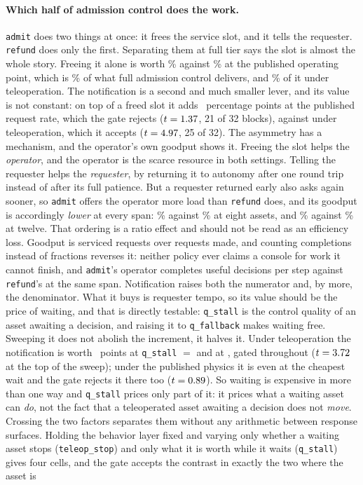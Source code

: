 \documentclass[11pt]{article}
\begin{document}
\paragraph{Which half of admission control does the work.} \texttt{admit} does two things at once: it frees the service slot, and it tells the requester. \texttt{refund} does only the first. Separating them at full tier says the slot is almost the whole story. Freeing it alone is worth \qRefundClear\% against \qBlindClear\% at the published operating point, which is \qRefundShare\% of what full admission control delivers, and \qTeleRefundShare\% of it under teleoperation. The notification is a second and much smaller lever, and its value is not constant: on top of a freed slot it adds \qNotifyPub{}~percentage points at the published request rate, which the gate rejects ($t = 1.37{}$, 21 of 32 blocks), against \qNotifyTele{} under teleoperation, which it accepts ($t = 4.97{}$, 25 of 32). The asymmetry has a mechanism, and the operator's own goodput shows it. Freeing the slot helps the \emph{operator}, and the operator is the scarce resource in both settings. Telling the requester helps the \emph{requester}, by returning it to autonomy after one round trip instead of after its full patience. But a requester returned early also asks again sooner, so \texttt{admit} offers the operator more load than \texttt{refund} does, and its goodput is accordingly \emph{lower} at every span: \qGoodAdmitEight\% against \qGoodRefundEight\% at eight assets, and \qGoodAdmitTwelve\% against \qGoodRefundTwelve\% at twelve. That ordering is a ratio effect and should not be read as an efficiency loss. Goodput is serviced requests over requests made, and counting completions instead of fractions reverses it: neither policy ever claims a console for work it cannot finish, and \texttt{admit}'s operator completes \qServedAdmit{} useful decisions per step against \texttt{refund}'s \qServedRefund{} at the same span. Notification raises both the numerator and, by more, the denominator. What it buys is requester tempo, so its value should be the price of waiting, and that is directly testable: \texttt{q\_stall} is the control quality of an asset awaiting a decision, and raising it to \texttt{q\_fallback} makes waiting free. Sweeping it does not abolish the increment, it halves it. Under teleoperation the notification is worth \qNotifyTeleLow{}~points at \texttt{q\_stall} $=$ \qStallLow{} and \qNotifyTeleFree{} at \qStallFree{}, gated throughout ($t = 3.72{}$ at the top of the sweep); under the published physics it is \qNotifyPubFree{} even at the cheapest wait and the gate rejects it there too ($t = 0.89{}$). So waiting is expensive in more than one way and \texttt{q\_stall} prices only part of it: it prices what a waiting asset can \emph{do}, not the fact that a teleoperated asset awaiting a decision does not \emph{move}. Crossing the two factors separates them without any arithmetic between response surfaces. Holding the behavior layer fixed and varying only whether a waiting asset stops (\texttt{teleop\_stop}) and only what it is worth while it waits (\texttt{q\_stall}) gives four cells, and the gate accepts the contrast in exactly the two where the asset is 
\end{document}
